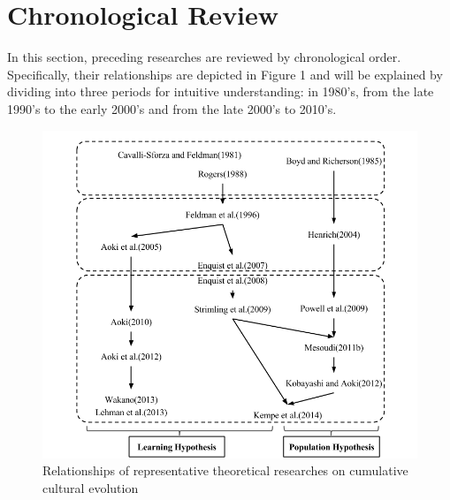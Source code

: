 \documentclass[a4paper, dvipdfmx]{article}
\begin{document}
\section{Chronological Review}

In this section, preceding researches are reviewed by chronological order. Specifically, their relationships are depicted in Figure 1 and will be explained by dividing into three periods for intuitive understanding: in 1980's, from the late 1990's to the early 2000's and from the late 2000's to 2010's.

\begin{figure}[H]
  \centering
  \includegraphics[width=12cm]{fig2_1.png}
  \caption{Relationships of representative theoretical researches on cumulative cultural evolution}
  \label{Figure1}
\end{figure}
\end{document}
